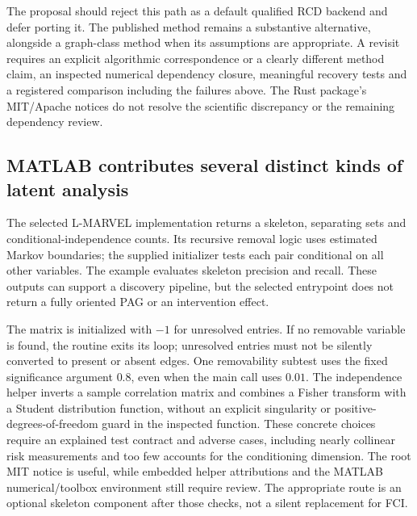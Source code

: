 The proposal should reject this path as a default qualified RCD backend
and defer porting it. The published method remains a substantive
alternative, alongside a graph-class method when its assumptions are
appropriate. A revisit requires an explicit algorithmic correspondence
or a clearly different method claim, an inspected numerical dependency
closure, meaningful recovery tests and a registered comparison including
the failures above. The Rust package's MIT/Apache notices do not resolve
the scientific discrepancy or the remaining dependency review.
\citep{exec14_olatent_varlingam,exec14_olatent_rcd_paper}

\hypertarget{matlab-contributes-several-distinct-kinds-of-latent-analysis}{%
\subsection{MATLAB contributes several distinct kinds of latent
analysis}\label{matlab-contributes-several-distinct-kinds-of-latent-analysis}}

The selected L-MARVEL implementation returns a skeleton, separating sets
and conditional-independence counts. Its recursive removal logic uses
estimated Markov boundaries; the supplied initializer tests each pair
conditional on all other variables. The example evaluates skeleton
precision and recall. These outputs can support a discovery pipeline,
but the selected entrypoint does not return a fully oriented PAG or an
intervention effect. \citep{exec14_olatent_lmarvel}

The matrix is initialized with \(-1\) for unresolved entries. If no
removable variable is found, the routine exits its loop; unresolved
entries must not be silently converted to present or absent edges. One
removability subtest uses the fixed significance argument \(0.8\), even
when the main call uses \(0.01\). The independence helper inverts a
sample correlation matrix and combines a Fisher transform with a Student
distribution function, without an explicit singularity or
positive-degrees-of-freedom guard in the inspected function. These
concrete choices require an explained test contract and adverse cases,
including nearly collinear risk measurements and too few accounts for
the conditioning dimension. The root MIT notice is useful, while
embedded helper attributions and the MATLAB numerical/toolbox
environment still require review. The appropriate route is an optional
skeleton component after those checks, not a silent replacement for FCI.
\citep{exec14_olatent_lmarvel}

